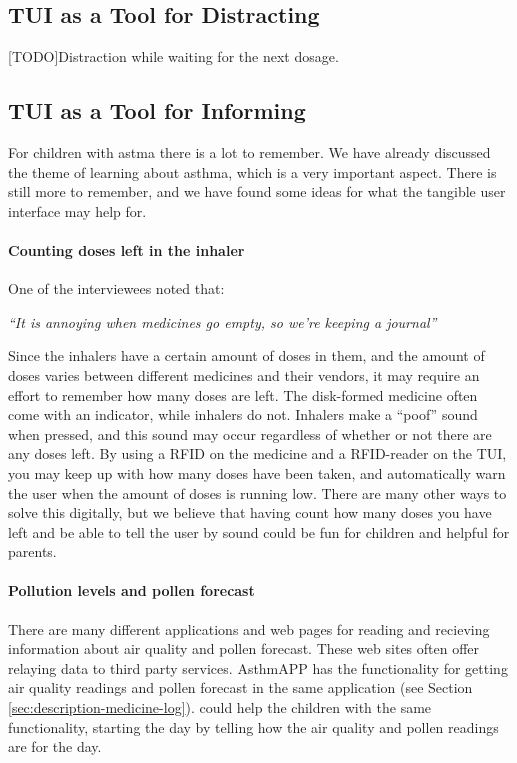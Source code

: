 \subsection{TUI as a Tool for Distracting}
\label{sec:tuiasatoolfordistracting} 
[TODO]Distraction while waiting for the next dosage. 

\subsection{TUI as a Tool for Informing}
For children with astma there is a lot to remember. We have already discussed the theme of learning about asthma, which is a very important aspect. There is still more to remember, and we have found some ideas for what the tangible user interface may help for. 

\paragraph{Counting doses left in the inhaler}
One of the interviewees noted that: 

\textit{``It is annoying when medicines go empty, so we're keeping a journal''}

Since the inhalers have a certain amount of doses in them, and the amount of doses varies between different medicines and their vendors, it may require an effort to remember how many doses are left. The disk-formed medicine often come with an indicator, while inhalers do not. Inhalers make a ``poof'' sound when pressed, and this sound may occur regardless of whether or not there are any doses left. By using a RFID on the medicine and a RFID-reader on the TUI, you may keep up with how many doses have been taken, and automatically warn the user when the amount of doses is running low. There are many other ways to solve this digitally, but we believe that having \buddy{} count how many doses you have left and be able to tell the user by sound could be fun for children and helpful for parents.

\paragraph{Pollution levels and pollen forecast}
There are many different applications and web pages for reading and recieving information about air quality and pollen forecast. These web sites often offer relaying data to third party services. AsthmAPP has the functionality for getting air quality readings and pollen forecast in the same application (see Section \ref{sec:description-medicine-log}).
\buddy{} could help the children with the same functionality, starting the day by telling how the air quality and pollen readings are for the day. 

